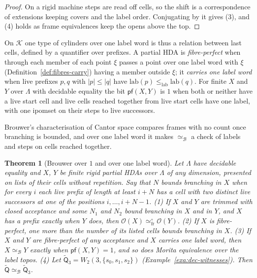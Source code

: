 \documentclass{lmcs}
\newtheorem{theorem}{Theorem}[section]
\theoremstyle{definition}
\theoremstyle{remark}
\newcommand{\Op}{\mathcal{O}}
\newcommand{\dimn}[1]{\lvert #1\rvert}
\newcommand{\lab}{\mathrm{lab}}
\newcommand{\lle}{\leq_{\mathrm{lab}}}
\newcommand{\eqFrF}{\simeq^{\circ}_{\mathrm{fr}}}
\providecommand{\Cls}{\mathcal{K}}
\providecommand{\lab}{\mathrm{lab}}
\providecommand{\eqB}{\simeq_{\mathcal{B}}}
\providecommand{\Wq}[3]{W_{#1}(#2,#3)}
\providecommand{\pfB}{\mathsf{pf}}
\providecommand{\wQt}{\tilde{\mathsf{Q}}}
\providecommand{\wQtt}{\tilde{\mathsf{Q}}_3}
\begin{document}
\begin{proof}
On a rigid machine steps are read off cells, so the shift is a correspondence of extensions keeping covers and the
label order. Conjugating by it gives
(3), and (4) holds as frame equivalences keep the opens above the top.
\end{proof}

On $\Cls$ one type of cylinders over one label word is thus a relation
between last cells, defined by a quantifier over prefixes. A partial HDA is
\emph{fibre-perfect} when through each member of each point $\xi$ passes a point over one label word with $\xi$
(Definition~\ref{def:fibres-carry}) having a member outside $\xi$; it \emph{carries one
label word} when live prefixes $p,q$ with $\dimn{p}\leq\dimn{q}$ have $\lab(p)\lle\lab(q)$. For
finite $X$ and $Y$ over $\Lambda$ with decidable equality the bit $\pfB(X,Y)$ is $1$ when both or neither have a live
start cell and live cells reached together from live start cells have one label, with one ipomset on their steps to
live successors.

Brouwer's characterisation of Cantor space compares frames with no count once branching is bounded, and over one
label word it makes $\eqB$ a check of labels and steps on cells reached together.

\begin{theorem}[Brouwer over $1$ and over one label word]\label{thm:dec-brouwer}\label{cor:dec-grow}
Let $\Lambda$ have decidable equality and $X$, $Y$ be finite rigid partial HDAs over $\Lambda$ of any dimension,
presented on lists of their cells without repetition. Say that $N$ \emph{bounds branching} in $X$ when for every $i$
each live prefix of length at least $i+N$ has a cell with two distinct live successors at one of the positions
$i,\dots,i+N-1$.
(1) If $X$ and $Y$ are trimmed with closed acceptance and
some $N_1$ and $N_2$ bound branching in $X$ and in $Y$, and $X$ has a prefix exactly when $Y$ does, then
$\Op(X)\eqFrF\Op(Y)$.
(2) If $X$ is fibre-perfect, one more than the number of its listed
cells bounds branching in $X$.
(3) If $X$ and $Y$ are fibre-perfect of any acceptance
and $X$ carries one label word, then $X\eqB Y$ exactly when $\pfB(X,Y)=1$, and so does Morita equivalence over the
label topos.
(4) Let $\wQtt=\Wq{2}{3}{\{s_0,s_1,s_2\}}$ (Example~\ref{exa:dec-witnesses}). Then
$\wQt\eqB\wQtt$.
\end{theorem}
\end{document}
